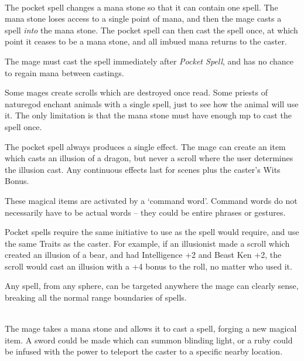 \begin{multicols}{2}
\spelllevel

\\
The pocket spell changes a mana stone so that it can contain one spell.
The mana stone loses access to a single point of mana, and then the mage casts a spell \textit{into} the mana stone.
The pocket spell can then cast the spell once, at which point it ceases to be a mana stone, and all imbued mana returns to the caster.

The mage must cast the spell immediately after \textit{Pocket Spell}, and has no chance to regain mana between castings.

Some mages create scrolls which are destroyed once read.  Some priests of \gls{naturegod} enchant animals with a single spell, just to see how the animal will use it.
The only limitation is that the mana stone must have enough \gls{mp} to cast the spell once.

The pocket spell always produces a single effect.
The mage can create an item which casts an illusion of a dragon, but never a scroll where the user determines the illusion cast.
Any continuous effects last for  scenes plus the caster's Wits Bonus.

These magical items are activated by a `command word'.
Command words do not necessarily have to be actual words -- they could be entire phrases or gestures.

Pocket spells require the same initiative to use as the spell would require, and use the same Traits as the caster.
For example, if an illusionist made a scroll which created an illusion of a bear, and had Intelligence +2 and Beast Ken +2, the scroll would cast an illusion with a +4 bonus to the roll, no matter who used it.

\spelllevel


Any spell, from any sphere, can be targeted anywhere the mage can clearly sense, breaking all the normal range boundaries of spells.

\spelllevel

\\
The mage takes a mana stone and allows it to cast a spell, forging a new magical item. A sword could be made which can summon blinding light, or a ruby could be infused with the power to teleport the caster to a specific nearby location.


\end{multicols}
